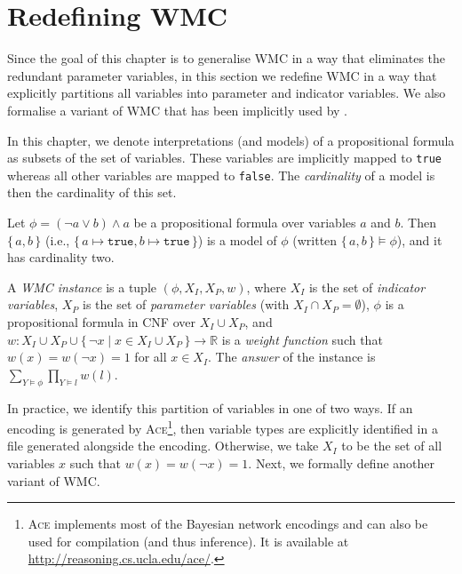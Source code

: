 \section{Redefining WMC}

Since the goal of this chapter is to generalise WMC in a way that eliminates the
redundant parameter variables, in this section we redefine WMC in a way that
explicitly partitions all variables into parameter and indicator variables. We
also formalise a variant of WMC that has been implicitly used by
\citet{DBLP:conf/ijcai/ChaviraD05,DBLP:conf/sat/ChaviraD06}.

In this chapter, we denote interpretations (and models) of a propositional
formula as subsets of the set of variables. These variables are implicitly
mapped to \texttt{true} whereas all other variables are mapped to
\texttt{false}. The \emph{cardinality} of a model is then the cardinality of
this set.

\begin{example}
  Let $\phi = (\neg a \lor b) \land a$ be a propositional formula over variables
  $a$ and $b$. Then $\{\, a, b \,\}$ (i.e.,
  $\{\, a \mapsto \texttt{true}, b \mapsto \texttt{true} \,\}$) is a model of
  $\phi$ (written $\{\, a, b \,\} \models \phi$), and it has cardinality two.
\end{example}

\begin{definition}[WMC]\label{def:wmc}
  A \emph{WMC instance} is a tuple $(\phi, X_I, X_P, w)$, where $X_I$ is the set
  of \emph{indicator variables}, $X_P$ is the set of \emph{parameter variables}
  (with $X_I \cap X_P = \emptyset$), $\phi$ is a propositional formula in CNF
  over $X_I \cup X_P$, and
  $w\colon X_I \cup X_P \cup \{\, \neg x \mid x \in X_I \cup X_P \,\} \to \mathbb{R}$
  is a \emph{weight function} such that $w(x) = w(\neg x) = 1$ for all
  $x \in X_I$. The \emph{answer} of the instance is
  $\sum_{Y \models \phi} \prod_{Y \models l} w(l)$.
\end{definition}

In practice, we identify this partition of variables in one of two ways. If an
encoding is generated by \textsc{Ace}\footnote{\textsc{Ace}
  \citep{DBLP:journals/ai/ChaviraD08} implements most of the Bayesian network
  encodings and can also be used for compilation (and thus inference). It is
  available at \url{http://reasoning.cs.ucla.edu/ace/}.}, then variable types
are explicitly identified in a file generated alongside the encoding. Otherwise,
we take $X_I$ to be the set of all variables $x$ such that
$w(x) = w(\neg x) = 1$. Next, we formally define another variant of WMC\@.

